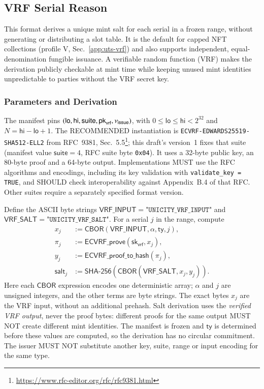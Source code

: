 \subsection{VRF Serial Reason}\label{app:reason-vrf}

This format derives a unique mint salt for each serial in a frozen range, without generating or distributing a slot table. It is the default for capped NFT collections (profile V, Sec.~\ref{app:uts-vrf}) and also supports independent, equal-denomination fungible issuance. A verifiable random function (VRF) makes the derivation publicly checkable at mint time while keeping unused mint identities unpredictable to parties without the VRF secret key.

\subsubsection{Parameters and Derivation}

The manifest pins $(\mathsf{lo},\mathsf{hi},\mathsf{suite},\mathsf{pk}_\mathsf{vrf},\nu_\mathsf{issue})$, with $0 \le \mathsf{lo} \le \mathsf{hi} < 2^{32}$ and $N=\mathsf{hi}-\mathsf{lo}+1$. The RECOMMENDED instantiation is \texttt{ECVRF-EDWARDS25519-SHA512-ELL2} from RFC~9381, Sec.~5.5\footnote{\url{https://www.rfc-editor.org/rfc/rfc9381.html}}; this draft's version~1 fixes that suite (manifest value $\mathsf{suite}=4$, RFC suite byte \texttt{0x04}). It uses a 32-byte public key, an 80-byte proof and a 64-byte output. Implementations MUST use the RFC algorithms and encodings, including its key validation with \texttt{validate\_key = TRUE}, and SHOULD check interoperability against Appendix~B.4 of that RFC. Other suites require a separately specified format version.

Define the ASCII byte strings $\mathsf{VRF\_INPUT}=\texttt{"UNICITY\_VRF\_INPUT"}$ and $\mathsf{VRF\_SALT}=\texttt{"UNICITY\_VRF\_SALT"}$. For a serial $j$ in the range, compute
\[
\begin{aligned}
x_j &:= \mathsf{CBOR}(\mathsf{VRF\_INPUT},\alpha,\mathsf{ty},j),\\
\pi_j &:= \mathsf{ECVRF\_prove}(\mathsf{sk}_\mathsf{vrf},x_j),\\
y_j &:= \mathsf{ECVRF\_proof\_to\_hash}(\pi_j),\\
\mathsf{salt}_j &:= \mathsf{SHA\text{-}256}(\mathsf{CBOR}(\mathsf{VRF\_SALT},x_j,y_j)).
\end{aligned}
\]
Here each $\mathsf{CBOR}$ expression encodes one deterministic array; $\alpha$ and $j$ are unsigned integers, and the other terms are byte strings. The exact bytes $x_j$ are the VRF input, without an additional prehash. Salt derivation uses the \emph{verified VRF output}, never the proof bytes: different proofs for the same output MUST NOT create different mint identities. The manifest is frozen and $\mathsf{ty}$ is determined before these values are computed, so the derivation has no circular commitment. The issuer MUST NOT substitute another key, suite, range or input encoding for the same type.

